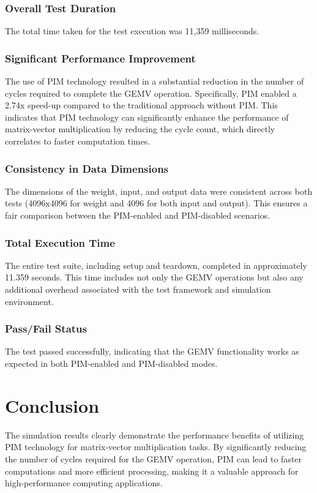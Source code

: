 \documentclass[12pt]{article}
\begin{document}
\subsubsection{Overall Test Duration}
The total time taken for the test execution was 11,359 milliseconds.


\subsubsection{Significant Performance Improvement}
The use of PIM technology resulted in a substantial reduction in the number of cycles required to complete the GEMV operation. Specifically, PIM enabled a 2.74x speed-up compared to the traditional approach without PIM. This indicates that PIM technology can significantly enhance the performance of matrix-vector multiplication by reducing the cycle count, which directly correlates to faster computation times.

\subsubsection{Consistency in Data Dimensions}
The dimensions of the weight, input, and output data were consistent across both tests (4096x4096 for weight and 4096 for both input and output). This ensures a fair comparison between the PIM-enabled and PIM-disabled scenarios.

\subsubsection{Total Execution Time}
The entire test suite, including setup and teardown, completed in approximately 11.359 seconds. This time includes not only the GEMV operations but also any additional overhead associated with the test framework and simulation environment.

\subsubsection{Pass/Fail Status}
The test passed successfully, indicating that the GEMV functionality works as expected in both PIM-enabled and PIM-disabled modes.







\section{Conclusion}
The simulation results clearly demonstrate the performance benefits of utilizing PIM technology for matrix-vector multiplication tasks. By significantly reducing the number of cycles required for the GEMV operation, PIM can lead to faster computations and more efficient processing, making it a valuable approach for high-performance computing applications.
\end{document}
